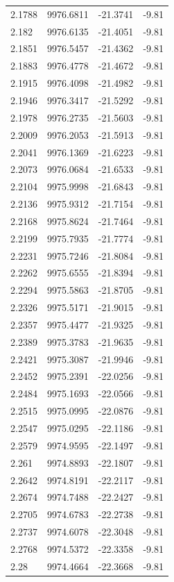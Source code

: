 \begin{table}[H]
\begin{tabular}{llll}
2.1788 & 9976.6811 & -21.3741 & -9.81 \\
2.182 & 9976.6135 & -21.4051 & -9.81 \\
2.1851 & 9976.5457 & -21.4362 & -9.81 \\
2.1883 & 9976.4778 & -21.4672 & -9.81 \\
2.1915 & 9976.4098 & -21.4982 & -9.81 \\
2.1946 & 9976.3417 & -21.5292 & -9.81 \\
2.1978 & 9976.2735 & -21.5603 & -9.81 \\
2.2009 & 9976.2053 & -21.5913 & -9.81 \\
2.2041 & 9976.1369 & -21.6223 & -9.81 \\
2.2073 & 9976.0684 & -21.6533 & -9.81 \\
2.2104 & 9975.9998 & -21.6843 & -9.81 \\
2.2136 & 9975.9312 & -21.7154 & -9.81 \\
2.2168 & 9975.8624 & -21.7464 & -9.81 \\
2.2199 & 9975.7935 & -21.7774 & -9.81 \\
2.2231 & 9975.7246 & -21.8084 & -9.81 \\
2.2262 & 9975.6555 & -21.8394 & -9.81 \\
2.2294 & 9975.5863 & -21.8705 & -9.81 \\
2.2326 & 9975.5171 & -21.9015 & -9.81 \\
2.2357 & 9975.4477 & -21.9325 & -9.81 \\
2.2389 & 9975.3783 & -21.9635 & -9.81 \\
2.2421 & 9975.3087 & -21.9946 & -9.81 \\
2.2452 & 9975.2391 & -22.0256 & -9.81 \\
2.2484 & 9975.1693 & -22.0566 & -9.81 \\
2.2515 & 9975.0995 & -22.0876 & -9.81 \\
2.2547 & 9975.0295 & -22.1186 & -9.81 \\
2.2579 & 9974.9595 & -22.1497 & -9.81 \\
2.261 & 9974.8893 & -22.1807 & -9.81 \\
2.2642 & 9974.8191 & -22.2117 & -9.81 \\
2.2674 & 9974.7488 & -22.2427 & -9.81 \\
2.2705 & 9974.6783 & -22.2738 & -9.81 \\
2.2737 & 9974.6078 & -22.3048 & -9.81 \\
2.2768 & 9974.5372 & -22.3358 & -9.81 \\
2.28 & 9974.4664 & -22.3668 & -9.81 \\

\end{tabular}
\end{table}
